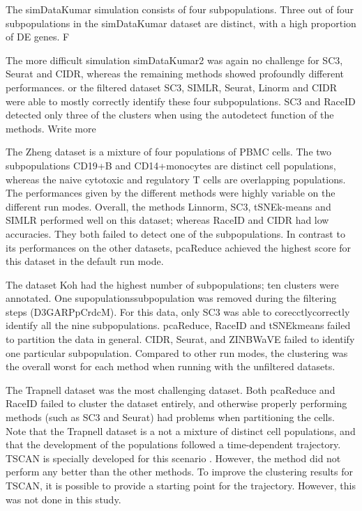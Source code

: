 \documentclass[11pt, a4paper]{article}\usepackage[]{graphicx}\usepackage[]{color}
\begin{document}
The simDataKumar simulation consists of four subpopulations. Three out of four subpopulations in the simDataKumar dataset are distinct, with a high proportion of DE genes. F

The more difficult simulation simDataKumar2 was again no challenge for SC3, Seurat and CIDR, whereas the remaining methods showed profoundly different performances. or the filtered dataset SC3, SIMLR, Seurat, Linorm and CIDR were able to mostly correctly identify these four subpopulations. SC3 and RaceID detected only three of the clusters when using the autodetect function of the methods. Write more

The Zheng dataset is a mixture of four populations of PBMC cells. The two subpopulations CD19+B and CD14+monocytes are distinct cell populations, whereas the naive cytotoxic and regulatory T cells are overlapping populations. The performances given by the different methods were highly variable on the different run modes. Overall, the methods Linnorm, SC3, tSNEk-means and SIMLR performed well on this dataset; whereas RaceID and CIDR had low accuracies. They both failed to detect one of the subpopulations. In contrast to its performances on the other datasets, pcaReduce achieved the highest score for this dataset in the default run mode.

The dataset Koh had the highest number of subpopulations;  ten clusters were annotated. One supopulationssubpopulation was removed during the filtering steps (D3GARPpCrdcM). For this data, only SC3 was able to corecctlycorrectly identify all the nine subpopulations. pcaReduce, RaceID and tSNEkmeans failed to partition the data in general. CIDR, Seurat, and ZINBWaVE failed to identify one particular subpopulation. Compared to other run modes, the clustering was the overall worst for each method when running with the unfiltered datasets. 

The Trapnell dataset was the most challenging dataset. Both pcaReduce and RaceID failed to cluster the dataset entirely, and otherwise properly performing methods (such as SC3 and Seurat) had problems when partitioning the cells. Note that the Trapnell dataset is a not a mixture of distinct cell populations, and that the development of the populations followed a time-dependent trajectory. TSCAN is specially developed for this scenario \citep{ji2015tscan}. However, the method did not perform any better than the other methods. To improve the clustering results for TSCAN, it is possible to provide a starting point for the trajectory. However, this was not done in this study. 
\end{document}
